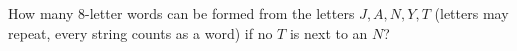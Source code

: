How many $8$-letter words can be formed from the letters $J,A,N,Y,T$ (letters may repeat, every string counts as a word) if no $T$ is next to an $N$?

